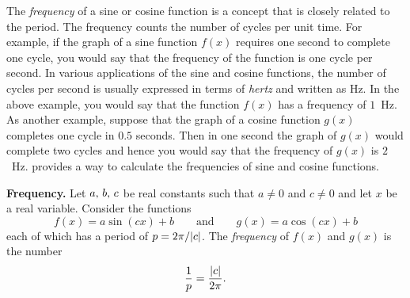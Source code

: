 \documentclass[a4paper,oneside,12pt]{article}
\begin{document}

The \emph{frequency} of a sine or cosine function is a concept that is
closely related to the period.  The frequency counts the number of
cycles per unit time.  For example, if the graph of a sine function
$f(x)$ requires one second to complete one cycle, you would say that
the frequency of the function is one cycle per second.  In various
applications of the sine and cosine functions, the number of cycles
per second is usually expressed in terms of \emph{hertz} and written
as Hz.  In the above example, you would say that the function $f(x)$
has a frequency of $1$~Hz.  As another example, suppose that the graph
of a cosine function $g(x)$ completes one cycle in $0.5$ seconds.
Then in one second the graph of $g(x)$ would complete two cycles and
hence you would say that the frequency of $g(x)$ is $2$~Hz.
 provides a way to
calculate the frequencies of sine and cosine functions.

\begin{definition}
\label{def:trigonometric:sine_cosine_frequency}
\textbf{Frequency.}
Let ${a},\, {b},\, {c}$ be real constants such that $a \neq 0$ and
$c \neq 0$ and let $x$ be a real variable.  Consider the functions
\[
f(x)
=
a \sin(cx) + b
\qquad
\text{and}
\qquad
g(x)
=
a \cos(cx) + b
\]
each of which has a period of $p = 2 \pi / \lvert c\rvert$.  The
\emph{frequency} of $f(x)$ and $g(x)$ is the number
\begin{equation}
\label{eqn:trigonometric:frequency_sin_cos}
\frac{1}{p}
=
\frac{\lvert c\rvert}{2\pi}.
\end{equation}
\end{definition}
\end{document}
